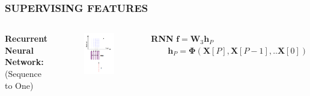 \documentclass{beamer}
\begin{document}
\begin{frame}
\frametitle{SUPERVISING FEATURES}
\begin{columns}[c]
\textbf{Recurrent Neural Network:}\\
(Sequence to One)
\begin{figure}
\includegraphics[width=\textwidth]{rnn_1}
\end{figure}
\begin{block}{\textbf{RNN}}
$\textbf{f} = \textbf{W}_{3}\textbf{h}_{P}$
$\qquad \textbf{h}_{P} = \bm{\Phi}(\textbf{X}[P], \textbf{X}[P-1], ..\textbf{X}[0])$
\end{block}

\end{columns}
\end{frame}
\end{document}
